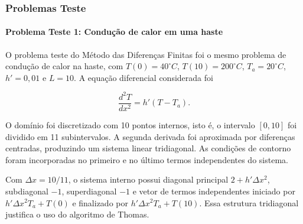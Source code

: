\subsubsection{Problemas Teste}

\paragraph{Problema Teste 1: Condução de calor em uma haste}

O problema teste do Método das Diferenças Finitas foi o mesmo problema de condução de calor na haste, com \(T(0)=40^\circ C\), \(T(10)=200^\circ C\), \(T_a=20^\circ C\), \(h'=0{,}01\) e \(L=10\). A equação diferencial considerada foi

\[
    \frac{d^2T}{dx^2}=h'(T-T_a).
\]

O domínio foi discretizado com 10 pontos internos, isto é, o intervalo \([0,10]\) foi dividido em 11 subintervalos. A segunda derivada foi aproximada por diferenças centradas, produzindo um sistema linear tridiagonal. As condições de contorno foram incorporadas no primeiro e no último termos independentes do sistema.

Com \(\Delta x=10/11\), o sistema interno possui diagonal principal \(2+h'\Delta x^2\), subdiagonal \(-1\), superdiagonal \(-1\) e vetor de termos independentes iniciado por \(h'\Delta x^2T_a+T(0)\) e finalizado por \(h'\Delta x^2T_a+T(10)\). Essa estrutura tridiagonal justifica o uso do algoritmo de Thomas.

